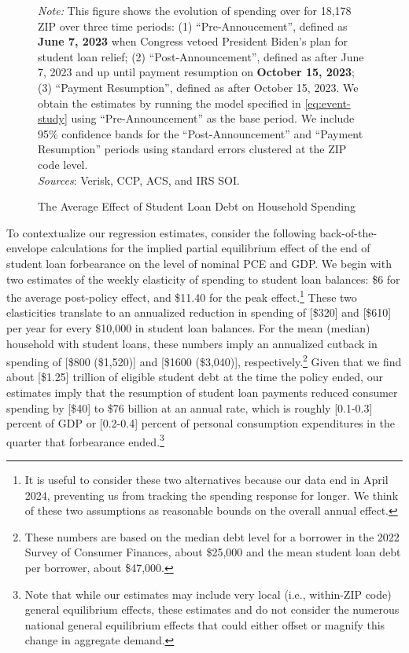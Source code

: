 \documentclass[12pt]{article}
\begin{document}
\begin{figure}[!ht]
    \centering
    \caption{The Average Effect of Student Loan Debt on Household Spending}
    \resizebox{\linewidth}{!}
    {
    
    }
    \label{fig:agg-spending-binned}

    \raggedright     \footnotesize{
    \emph{Note:} This figure shows the evolution of spending over for 18,178 ZIP over three time periods: (1) ``Pre-Annoucement'', defined as \textbf{June 7, 2023} when Congress vetoed President Biden's plan for student loan relief; (2) ``Post-Announcement'', defined as after June 7, 2023 and up until payment resumption on \textbf{October 15, 2023}; (3) ``Payment Resumption'', defined as after October 15, 2023. We obtain the estimates by running the model specified in \cref{eq:event-study} using ``Pre-Announcement'' as the base period. We include 95\% confidence bands for the ``Post-Announcement'' and ``Payment Resumption'' periods using standard errors clustered at the ZIP code level.
	\\
	\textit{Sources}: Verisk, CCP, ACS, and IRS SOI.
	}
\end{figure}

 
To contextualize our regression estimates, consider the following back-of-the-envelope calculations for the implied partial equilibrium effect of the end of student loan forbearance on the level of nominal PCE and GDP. We begin with two estimates of the weekly elasticity of spending to student loan balances: \$6 for the average post-policy effect, and \$11.40 for the peak effect.\footnote{It is useful to consider these two alternatives because our data end in April 2024, preventing us from tracking the spending response for longer. We think of these two assumptions as reasonable bounds on the overall annual effect.} These two elasticities translate to an annualized reduction in spending of [\$320] and [\$610] per year for every \$10,000 in student loan balances. For the mean (median) household with student loans, these numbers imply an annualized cutback in spending of [\$800 (\$1,520)] and [\$1600 (\$3,040)], respectively.\footnote{These numbers are based on the median debt level for a borrower in the 2022 Survey of Consumer Finances, about \$25,000 and the mean student loan debt per borrower, about \$47,000.} Given that we find about [\$1.25] trillion of eligible student debt at the time the policy ended, our estimates imply that the resumption of student loan payments reduced consumer spending by [\$40] to \$76 billion at an annual rate, which is roughly [0.1-0.3] percent of GDP or [0.2-0.4] percent of personal consumption expenditures in the quarter that forbearance ended.\footnote{Note that while our estimates may include very local (i.e., within-ZIP code) general equilibrium effects, these estimates and do not consider the numerous national general equilibrium effects that could either offset or magnify this change in aggregate demand.} 
\end{document}
